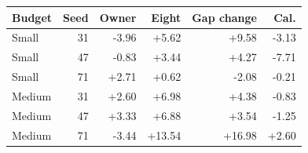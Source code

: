 \begin{tabular}{@{}lrrrrr@{}}
\toprule
Budget & Seed & Owner & Eight & Gap change & Cal.\\
\midrule
Small & 31 & -3.96 & +5.62 & +9.58 & -3.13\\
Small & 47 & -0.83 & +3.44 & +4.27 & -7.71\\
Small & 71 & +2.71 & +0.62 & -2.08 & -0.21\\
Medium & 31 & +2.60 & +6.98 & +4.38 & -0.83\\
Medium & 47 & +3.33 & +6.88 & +3.54 & -1.25\\
Medium & 71 & -3.44 & +13.54 & +16.98 & +2.60\\
\bottomrule
\end{tabular}

